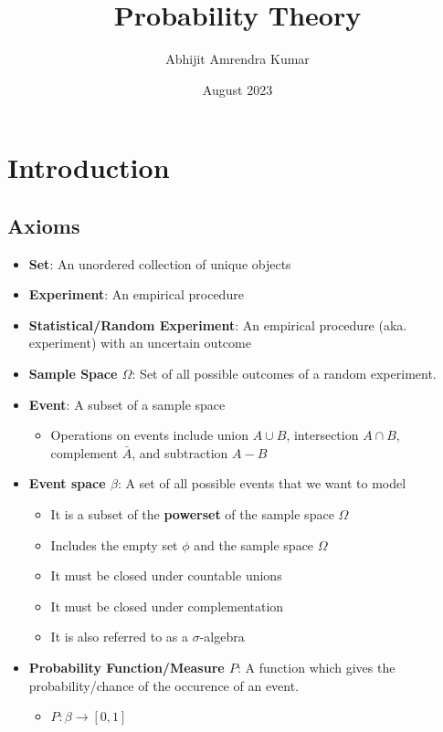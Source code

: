 \documentclass{report}
\title{Probability Theory}
\author{Abhijit Amrendra Kumar}
\date{August 2023}
\begin{document}
\maketitle

\chapter{Introduction}
\section{Axioms}

\begin{itemize}
  \item \textbf{Set}: An unordered collection of unique objects
  \item \textbf{Experiment}: An empirical procedure
  \item \textbf{Statistical/Random Experiment}: An empirical procedure (aka. experiment) with an uncertain outcome
  \item \textbf{Sample Space $\Omega$}: Set of all possible outcomes of a random experiment.
  \item \textbf{Event}: A subset of a sample space
        \begin{itemize}
          \item Operations on events include union $A\cup B$, intersection $A\cap B$, complement $\bar{A}$, and subtraction $A-B$
        \end{itemize}
  \item \textbf{Event space $\beta$}: A set of all possible events that we want to model
        \begin{itemize}
          \item It is a subset of the \textbf{powerset} of the sample space $\Omega$
          \item Includes the empty set $\phi$ and the sample space $\Omega$
          \item It must be closed under countable unions
          \item It must be closed under complementation
          \item It is also referred to as a $\sigma$-algebra
        \end{itemize}
  \item \textbf{Probability Function/Measure $P$}: A function which gives the probability/chance of the occurence of an event.
        \begin{itemize}
          \item $P : \beta \rightarrow [0,1]$

\end{itemize}
\end{itemize}
\end{document}
